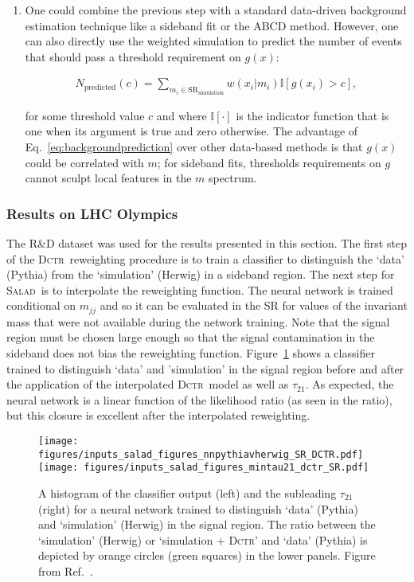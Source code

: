 \documentclass[a4paper,11pt]{article}
\begin{document}
\begin{enumerate}
\item One could combine the previous step with a standard data-driven background estimation technique like a sideband fit or the ABCD method.  However, one can also directly use the weighted simulation to predict the number of events that should pass a threshold requirement on $g(x)$:

\begin{align}
\label{eq:backgroundprediction}
N_\text{predicted}(c)=\sum_{m_i\in\text{SR}_\text{simulation}} w(x_i|m_i)\mathbb{I}[g(x_i)>c],
\end{align}

for some threshold value $c$ and where $\mathbb{I}[\cdot]$ is the indicator function that is one when its argument is true and zero otherwise.  The advantage of Eq.~\ref{eq:backgroundprediction} over other data-based methods is that $g(x)$ could be correlated with $m$; for sideband fits, thresholds requirements on $g$ cannot sculpt local features in the $m$ spectrum.

\end{enumerate}

\subsubsection{Results on LHC Olympics}


The R\&D dataset was used for the results presented in this section. The first step of the \textsc{Dctr}~reweighting procedure is to train a classifier to distinguish the `data' (Pythia) from the `simulation' (Herwig) in a sideband region.  The next step for \textsc{Salad}~is to interpolate the reweighting function.  The neural network is trained conditional on $m_{jj}$ and so it can be evaluated in the SR for values of the invariant mass that were not available during the network training.  Note that the signal region must be chosen large enough so that the signal contamination in the sideband does not bias the reweighting function.  Figure~\ref{fig:dctrmodel_SR} shows a classifier trained to distinguish `data' and 'simulation' in the signal region before and after the application of the interpolated \textsc{Dctr}~model as well as $\tau_{21}$.  As expected, the neural network is a linear function of the likelihood ratio (as seen in the ratio), but this closure is excellent after the interpolated reweighting.

\begin{figure}[h!]
\centering
\texttt{[image: figures/inputs\_salad\_figures\_nnpythiavherwig\_SR\_DCTR.pdf]}
\texttt{[image: figures/inputs\_salad\_figures\_mintau21\_dctr\_SR.pdf]}
\caption{A histogram of the classifier output (left) and the subleading $\tau_{21}$ (right) for a neural network trained to distinguish `data' (Pythia) and `simulation' (Herwig) in the signal region. The ratio between the `simulation' (Herwig) or `simulation + \textsc{Dctr}' and `data' (Pythia) is depicted by orange circles (green squares) in the lower panels.  Figure from Ref.~\cite{Andreassen:2020nkr}.}
\label{fig:dctrmodel_SR}
\end{figure}
\end{document}
